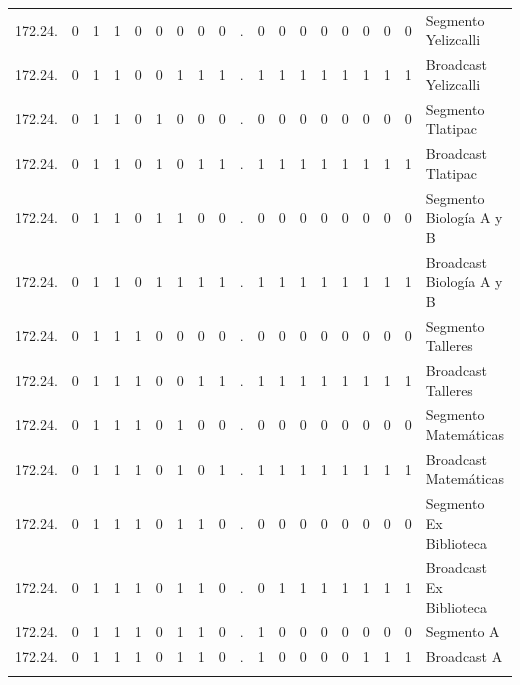 \begin{center}
{\begin{tabular}{r cccccccc c cccccccc l}
172.24. & 0 & 1 & 1 & 0 & \multicolumn{1}{c|}{0} & 0 & 0 & 0 & . & 0 & 0 & 0 & 0 & 0 & 0 & 0 & 0 & Segmento Yelizcalli \\
172.24. & 0 & 1 & 1 & 0 & \multicolumn{1}{c|}{0} & 1 & 1 & 1 & . & 1 & 1 & 1 & 1 & 1 & 1 & 1 & 1 & Broadcast Yelizcalli \\
\addlinespace

172.24. & 0 & 1 & 1 & 0 & 1 & \multicolumn{1}{c|}{0} & 0 & 0 & . & 0 & 0 & 0 & 0 & 0 & 0 & 0 & 0 & Segmento Tlatipac \\
172.24. & 0 & 1 & 1 & 0 & 1 & \multicolumn{1}{c|}{0} & 1 & 1 & . & 1 & 1 & 1 & 1 & 1 & 1 & 1 & 1 & Broadcast Tlatipac \\
\addlinespace

172.24. & 0 & 1 & 1 & 0 & 1 & \multicolumn{1}{c|}{1} & 0 & 0 & . & 0 & 0 & 0 & 0 & 0 & 0 & 0 & 0 & Segmento Biología A y B \\
172.24. & 0 & 1 & 1 & 0 & 1 & \multicolumn{1}{c|}{1} & 1 & 1 & . & 1 & 1 & 1 & 1 & 1 & 1 & 1 & 1 & Broadcast Biología A y B \\
\addlinespace

172.24. & 0 & 1 & 1 & 1 & 0 & \multicolumn{1}{c|}{0} & 0 & 0 & . & 0 & 0 & 0 & 0 & 0 & 0 & 0 & 0 & Segmento Talleres \\
172.24. & 0 & 1 & 1 & 1 & 0 & \multicolumn{1}{c|}{0} & 1 & 1 & . & 1 & 1 & 1 & 1 & 1 & 1 & 1 & 1 & Broadcast Talleres \\
\addlinespace

172.24. & 0 & 1 & 1 & 1 & 0 & 1 & \multicolumn{1}{c|}{0} & 0 & . & 0 & 0 & 0 & 0 & 0 & 0 & 0 & 0 & Segmento Matemáticas \\
172.24. & 0 & 1 & 1 & 1 & 0 & 1 & \multicolumn{1}{c|}{0} & 1 & . & 1 & 1 & 1 & 1 & 1 & 1 & 1 & 1 & Broadcast Matemáticas \\
\addlinespace

172.24. & 0 & 1 & 1 & 1 & 0 & 1 & 1 & 0 & . & \multicolumn{1}{c|}{0} & 0 & 0 & 0 & 0 & 0 & 0 & 0 & Segmento Ex Biblioteca \\
172.24. & 0 & 1 & 1 & 1 & 0 & 1 & 1 & 0 & . & \multicolumn{1}{c|}{0} & 1 & 1 & 1 & 1 & 1 & 1 & 1 & Broadcast Ex Biblioteca \\
\addlinespace

172.24. & 0 & 1 & 1 & 1 & 0 & 1 & 1 & 0 & . & 1 & 0 & 0 & 0 & \multicolumn{1}{c|}{0} & 0 & 0 & 0 & Segmento A \\
172.24. & 0 & 1 & 1 & 1 & 0 & 1 & 1 & 0 & . & 1 & 0 & 0 & 0 & \multicolumn{1}{c|}{0} & 1 & 1 & 1 & Broadcast A \\
\addlinespace


\end{tabular}}
\end{center}
